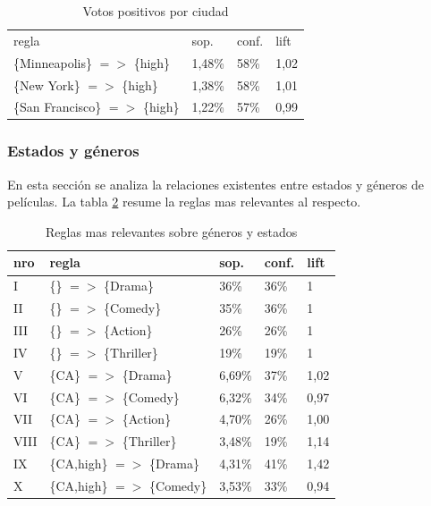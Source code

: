 \documentclass[journal]{IEEEtran}
\begin{document}
\begin{table}[ht!]
\caption{Votos positivos por ciudad}
\label{citi_high}
\centering
\begin{tabular}{l l l l }
regla & sop. & conf. & lift \\
\{Minneapolis\} $=$$>$ \{high\} & 1,48\% & 58\% & 1,02 \\
\{New York\} $=$$>$ \{high\} & 1,38\% & 58\% & 1,01 \\
\{San Francisco\} $=$$>$ \{high\} & 1,22\% & 57\% & 0,99 \\
\end{tabular}
\end{table}


\subsubsection{Estados y géneros}
En esta sección se analiza la relaciones existentes entre estados y géneros
de películas. La tabla \ref{table_genre_state} resume la reglas mas relevantes al respecto.

\begin{table}[ht!]
\caption{Reglas mas relevantes sobre géneros y estados}
\label{table_genre_state}
\centering
\begin{tabular}{l l l l l }
nro & regla & sop. & conf. & lift \\
\hline
I & \{\} $=$$>$ \{Drama\} & 36\% & 36\% & 1 \\
II & \{\} $=$$>$ \{Comedy\} & 35\% & 36\% & 1 \\
III & \{\} $=$$>$ \{Action\} & 26\% & 26\% & 1 \\
IV & \{\} $=$$>$ \{Thriller\} & 19\% & 19\% & 1 \\
V & \{CA\} $=$$>$ \{Drama\} & 6,69\% & 37\% & 1,02 \\
VI & \{CA\} $=$$>$ \{Comedy\} & 6,32\% & 34\% & 0,97 \\
VII & \{CA\} $=$$>$ \{Action\} & 4,70\% & 26\% & 1,00 \\
VIII & \{CA\} $=$$>$ \{Thriller\} & 3,48\% & 19\% & 1,14 \\
IX & \{CA,high\} $=$$>$ \{Drama\} & 4,31\% & 41\% & 1,42 \\
X & \{CA,high\} $=$$>$ \{Comedy\} & 3,53\% & 33\% & 0,94 \\
\end{tabular}
\end{table}
\end{document}
